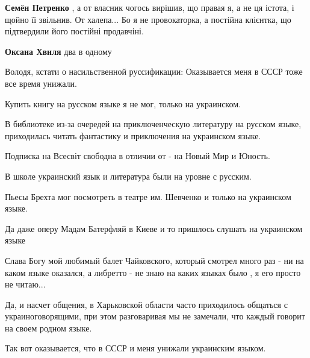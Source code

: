 \begin{itemize}
\begin{itemize}
 
\textbf{Семён Петренко} , а от власник чогось вирішив, що правая я, а не ця
істота, і щойно її звільнив. От халепа... Бо я не провокаторка, а постійна
клієнтка, що підтвердили його постійні продавчіні.

 
\textbf{Оксана Хвиля} два в одному


Володя, кстати о насильственной руссификации: Оказывается меня в СССР тоже все
время унижали.

Купить книгу на русском языке я не мог, только на украинском.

В библиотеке из-за очередей на приключенческую литературу на русском языке,
приходилась читать фантастику и приключения на украинском языке.

Подписка на Всесвіт свободна в отличии от - на Новый Мир и Юность.

В школе украинский язык и литература были на уровне с русским.

Пьесы Брехта мог посмотреть в театре им. Шевченко и только на украинском языке.

Да даже оперу Мадам Батерфляй в Киеве и то пришлось слушать на украинском языке
\Smiley[1.0][yellow]

Слава Богу мой любимый балет Чайковского, который смотрел много раз - ни на
каком языке оказался, а либретто - не знаю на каких языках было , я его просто
не читаю...

Да, и насчет общения, в Харьковской области часто приходилось общаться с
украиноговорящими, при этом разговаривая мы не замечали, что каждый говорит на
своем родном языке.

Так вот оказывается, что в СССР и меня унижали украинским языком. \Smiley[1.0][yellow]

 

\end{itemize}
\end{itemize}
